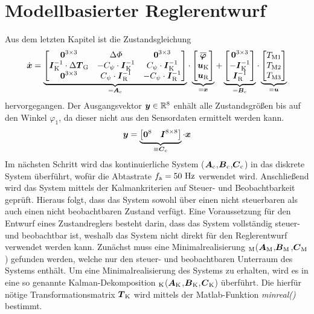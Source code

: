 \section{Modellbasierter Reglerentwurf}
Aus dem letzten Kapitel ist die Zustandsgleichung
\begin{equation}
\dot{\boldsymbol{x}} = \underbrace{\begin{bmatrix}
\boldsymbol{0}^{3\times 3} & \Delta\varPhi & \boldsymbol{0}^{3\times 3} 
\\
\boldsymbol{I}_{\text{K}}^{-1}\cdot\Delta\boldsymbol{T}_{\text{G}} & -C_{\psi}\cdot\boldsymbol{I}^{-1}_{\text{K}} & C_{\psi}\cdot\boldsymbol{I}^{-1}_{\text{K}}
\\
\boldsymbol{0}^{3\times 3} & C_{\psi}\cdot\boldsymbol{I}^{-1}_{\text{R}} & -C_{\psi}\cdot\boldsymbol{I}^{-1}_{\text{R}}
\end{bmatrix}}_{=\boldsymbol{A}_{\text{c}}} \cdot \underbrace{\begin{bmatrix}
\boldsymbol{\overline{\varphi}} 
\\
\boldsymbol{u}_{\text{K}} \\
\boldsymbol{u}_{\text{R}}
\end{bmatrix}}_{=\boldsymbol{x}}
+
\underbrace{\begin{bmatrix}
\boldsymbol{0}^{3\times 3}
\\
-\boldsymbol{I}^{-1}_{\text{K}}
\\
\boldsymbol{I}^{-1}_{\text{R}}
\end{bmatrix}}_{=\boldsymbol{B}_{\text{c}}}\cdot \underbrace{\begin{bmatrix}
T_{\text{M1}} \\ T_{\text{M2}} \\ T_{\text{M3}}
\end{bmatrix}}_{=\boldsymbol{u}}
\end{equation}
hervorgegangen. Der Ausgangsvektor $\boldsymbol{y}\in \mathbb{R}^8$ enhält alle Zustandsgrößen bis auf den Winkel $\varphi_1$, da dieser nicht aus den Sensordaten ermittelt werden kann.
\begin{equation}
\boldsymbol{y} = \underbrace{\begin{bmatrix}
\boldsymbol{0}^8 & \boldsymbol{I}^{8\times 8}
\end{bmatrix}}_{\equiv \boldsymbol{C}_{\text{c}}} \cdot \boldsymbol{x}
\end{equation}
Im nächsten Schritt wird das kontinuierliche System ($\boldsymbol{A}_{\text{c}}$,$\boldsymbol{B}_{\text{c}}$,$\boldsymbol{C}_{\text{c}}$) in das diskrete System  überführt, wofür die Abtastrate $f_{\text{a}}=50\text{ Hz}$ verwendet wird.
Anschließend wird das System mittels der Kalmankriterien auf Steuer- und Beobachtbarkeit geprüft. Hieraus folgt, dass das System sowohl über einen nicht steuerbaren als auch einen nicht beobachtbaren Zustand verfügt. Eine Voraussetzung für den Entwurf eines Zustandreglers besteht darin, dass das System vollständig steuer- und beobachtbar ist, weshalb das System  nicht direkt für den Reglerentwurf verwendet werden kann. Zunächst muss eine Minimalrealisierung $_{\text{M}}$($\boldsymbol{A}_{\text{M}}$,$\boldsymbol{B}_{\text{M}}$,$\boldsymbol{C}_{\text{M}}$) gefunden werden, welche nur den steuer- und beobachtbaren Unterraum des Systems enthält. Um eine Minimalrealisierung des Systems zu erhalten, wird es in eine so genannte Kalman-Dekomposition $_{\text{K}}$($\boldsymbol{A}_{\text{K}}$,$\boldsymbol{B}_{\text{K}}$,$\boldsymbol{C}_{\text{K}}$) überführt. Die hierfür nötige Transformationsmatrix $\boldsymbol{T}_{\text{K}}$ wird mittels der Matlab-Funktion \textit{minreal()} bestimmt.
